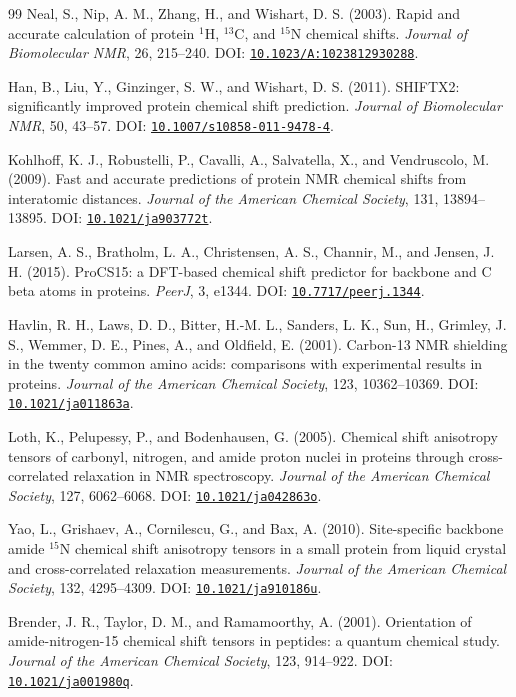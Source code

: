 \documentclass[11pt]{article}
\newcommand{\doi}[1]{\href{https://doi.org/#1}{\nolinkurl{#1}}}
\begin{document}
\begin{thebibliography}{99}
Neal, S., Nip, A. M., Zhang, H., and Wishart, D. S. (2003).
Rapid and accurate calculation of protein \(^{1}\mathrm H\),
\(^{13}\mathrm C\), and \(^{15}\mathrm N\) chemical shifts.
\emph{Journal of Biomolecular NMR}, 26, 215--240.
DOI: \doi{10.1023/A:1023812930288}.

Han, B., Liu, Y., Ginzinger, S. W., and Wishart, D. S. (2011).
SHIFTX2: significantly improved protein chemical shift prediction.
\emph{Journal of Biomolecular NMR}, 50, 43--57.
DOI: \doi{10.1007/s10858-011-9478-4}.

Kohlhoff, K. J., Robustelli, P., Cavalli, A., Salvatella, X., and
Vendruscolo, M. (2009).
Fast and accurate predictions of protein NMR chemical shifts from interatomic
distances.
\emph{Journal of the American Chemical Society}, 131, 13894--13895.
DOI: \doi{10.1021/ja903772t}.

Larsen, A. S., Bratholm, L. A., Christensen, A. S., Channir, M., and
Jensen, J. H. (2015).
ProCS15: a DFT-based chemical shift predictor for backbone and C beta atoms
in proteins.
\emph{PeerJ}, 3, e1344.
DOI: \doi{10.7717/peerj.1344}.

Havlin, R. H., Laws, D. D., Bitter, H.-M. L., Sanders, L. K., Sun, H.,
Grimley, J. S., Wemmer, D. E., Pines, A., and Oldfield, E. (2001).
Carbon-13 NMR shielding in the twenty common amino acids: comparisons with
experimental results in proteins.
\emph{Journal of the American Chemical Society}, 123, 10362--10369.
DOI: \doi{10.1021/ja011863a}.

Loth, K., Pelupessy, P., and Bodenhausen, G. (2005).
Chemical shift anisotropy tensors of carbonyl, nitrogen, and amide proton
nuclei in proteins through cross-correlated relaxation in NMR spectroscopy.
\emph{Journal of the American Chemical Society}, 127, 6062--6068.
DOI: \doi{10.1021/ja042863o}.

Yao, L., Grishaev, A., Cornilescu, G., and Bax, A. (2010).
Site-specific backbone amide \(^{15}\mathrm N\) chemical shift anisotropy
tensors in a small protein from liquid crystal and cross-correlated
relaxation measurements.
\emph{Journal of the American Chemical Society}, 132, 4295--4309.
DOI: \doi{10.1021/ja910186u}.

Brender, J. R., Taylor, D. M., and Ramamoorthy, A. (2001).
Orientation of amide-nitrogen-15 chemical shift tensors in peptides: a
quantum chemical study.
\emph{Journal of the American Chemical Society}, 123, 914--922.
DOI: \doi{10.1021/ja001980q}.


\end{thebibliography}
\end{document}

